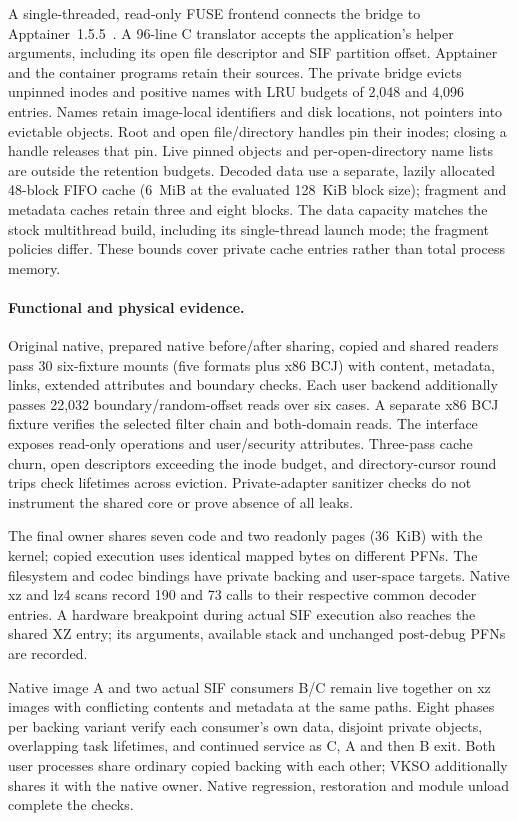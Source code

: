 A single-threaded, read-only FUSE frontend connects the bridge to
Apptainer~1.5.5~\cite{ev_apptainer155}. A 96-line C translator accepts the
application's helper arguments, including its open file descriptor and SIF
partition offset. Apptainer and the container programs retain their sources.
The private bridge evicts unpinned inodes and positive names with LRU budgets
of 2,048 and 4,096 entries. Names retain image-local identifiers and disk
locations, not pointers into evictable objects. Root and open file/directory
handles pin their inodes; closing a handle releases that pin. Live pinned
objects and per-open-directory name lists are outside the retention budgets.
Decoded data use a separate, lazily allocated 48-block FIFO cache (6~MiB
at the evaluated 128~KiB block size); fragment and metadata caches retain
three and eight blocks. The data capacity matches the stock multithread
build, including its single-thread launch mode; the fragment policies differ.
These bounds cover private cache entries rather than total process memory.

\paragraph{Functional and physical evidence.}
Original native, prepared native before/after sharing, copied and shared
readers pass 30 six-fixture mounts (five formats plus x86 BCJ) with content, metadata, links, extended
attributes and boundary checks. Each user backend additionally passes
22,032 boundary/random-offset reads over six cases. A separate x86 BCJ
fixture verifies the selected filter chain and both-domain reads.
The interface exposes read-only operations and user/security attributes.
Three-pass cache churn, open descriptors exceeding the inode budget, and
directory-cursor round trips check lifetimes across eviction. Private-adapter
sanitizer checks do not instrument the shared core or prove absence of all leaks.

The final owner shares seven code and two readonly pages (36~KiB) with
the kernel; copied execution uses identical mapped bytes on different PFNs.
The filesystem and codec bindings have private backing and user-space
targets. Native xz and lz4 scans record 190 and 73 calls to their respective
common decoder entries. A hardware breakpoint during actual SIF execution
also reaches the shared XZ entry; its arguments, available stack and
unchanged post-debug PFNs are recorded.

Native image A and two actual SIF consumers B/C remain live together on xz
images with conflicting contents and metadata at the same paths. Eight
phases per backing variant verify each consumer's own data, disjoint private
objects, overlapping task lifetimes, and continued service as C, A and then B
exit. Both user processes share ordinary copied backing with each other;
VKSO additionally shares it with the native owner. Native regression,
restoration and module unload complete the checks.

